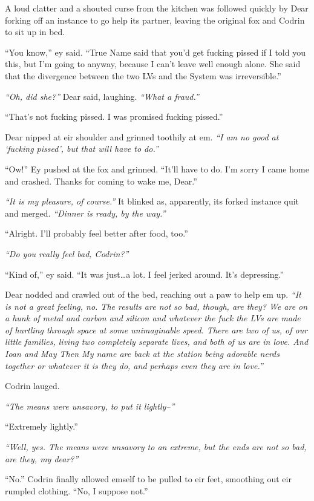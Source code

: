 A loud clatter and a shouted curse from the kitchen was followed quickly by Dear forking off an instance to go help its partner, leaving the original fox and Codrin to sit up in bed.

``You know,'' ey said. ``True Name said that you'd get fucking pissed if I told you this, but I'm going to anyway, because I can't leave well enough alone. She said that the divergence between the two LVs and the System was irreversible.''

\emph{``Oh, did she?''} Dear said, laughing. \emph{``What a fraud.''}

``That's not fucking pissed. I was promised fucking pissed.''

Dear nipped at eir shoulder and grinned toothily at em. \emph{``I am no good at `fucking pissed', but that will have to do.''}

``Ow!'' Ey pushed at the fox and grinned. ``It'll have to do. I'm sorry I came home and crashed. Thanks for coming to wake me, Dear.''

\emph{``It is my pleasure, of course.''} It blinked as, apparently, its forked instance quit and merged. \emph{``Dinner is ready, by the way.''}

``Alright. I'll probably feel better after food, too.''

\emph{``Do you really feel bad, Codrin?''}

``Kind of,'' ey said. ``It was just\ldots a lot. I feel jerked around. It's depressing.''

Dear nodded and crawled out of the bed, reaching out a paw to help em up. \emph{``It is not a great feeling, no. The results are not so bad, though, are they? We are on a hunk of metal and carbon and silicon and whatever the fuck the LVs are made of hurtling through space at some unimaginable speed. There are two of us, of our little families, living two completely separate lives, and both of us are in love. And Ioan and May Then My name are back at the station being adorable nerds together or whatever it is they do, and perhaps even they are in love.''}

Codrin lauged.

\emph{``The means were unsavory, to put it lightly--''}

``Extremely lightly.''

\emph{``Well, yes. The means were unsavory to an extreme, but the ends are not so bad, are they, my dear?''}

``No.'' Codrin finally allowed emself to be pulled to eir feet, smoothing out eir rumpled clothing. ``No, I suppose not.''
